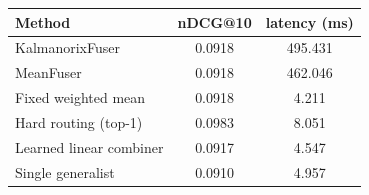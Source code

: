 \begin{tabular}{lcc}
\toprule
Method & nDCG@10 & latency (ms) \\
\midrule
KalmanorixFuser & 0.0918 & 495.431 \\
MeanFuser & 0.0918 & 462.046 \\
Fixed weighted mean & 0.0918 & 4.211 \\
Hard routing (top-1) & 0.0983 & 8.051 \\
Learned linear combiner & 0.0917 & 4.547 \\
Single generalist & 0.0910 & 4.957 \\
\bottomrule
\end{tabular}
